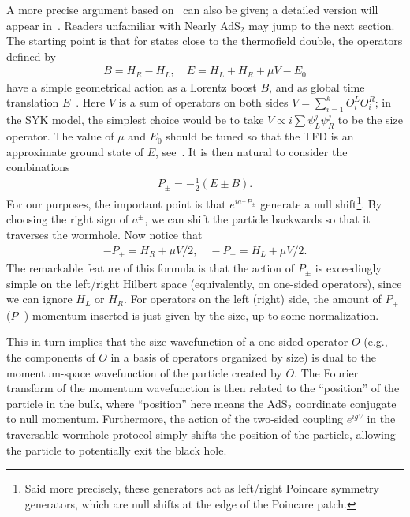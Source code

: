 \documentclass[aps,pra,reprint,floatfix,superscriptaddress, nofootinbib,longbibliography,onecolumn,notitlepage,12pt, tightenlines]{revtex4-1}
\begin{document}
\def\tfd{{\mathrm{TFD}}}
\newcommand{\eqn}[1]{\begin{equation}\begin{split} #1 \end{split}\end{equation}}

A more precise argument based on~\cite{lin2019symmetries} can also be given; a detailed version will appear in~\cite{longpaper}.  Readers unfamiliar with Nearly AdS$_2$ may jump to the next section.
The starting point is that for states close to the thermofield double, the operators defined by
\eqn{B = H_R - H_L, \quad E=H_L + H_R + \mu V - E_0 \label{eq:approximate-sym}}
have a simple geometrical action as a Lorentz boost $B$, and as global time translation $E$~\cite{maldacena2018eternal}.
Here $V$ is a sum of operators on both sides $V = \sum_{i=1}^k O_i^L O_i^R$; in the SYK model, the simplest choice would be to take $V \propto i \sum \psi^j_L \psi^j_R$ to be the size operator. The value of $\mu$ and $E_0$ should be tuned so that the TFD is an approximate ground state of $E$, see~\cite{maldacena2018eternal}. %
It is then natural to consider the combinations
\def\hf{ \frac{1}{2} }
\eqn{P_\pm = -\hf (E\pm B). }
For our purposes, the important point is that $e^{ia^\pm P_\pm}$ generate a null shift\footnote{Said more precisely, these generators act as left/right Poincare symmetry generators, which are null shifts at the edge of the Poincare patch.}. By choosing the right sign of $a^\pm$, we can shift the particle backwards so that it traverses the wormhole. Now notice that \eqn{-P_+ = H_R +  \mu V/2, \quad -P_- = H_L + \mu V/2.}
The remarkable feature of this formula is that the action of $P_\pm$ is exceedingly simple on the left/right Hilbert space (equivalently, on one-sided operators), since we can ignore $H_L$ or $H_R$. For operators on the left (right) side, the amount of $P_+$ ($P_-$) momentum inserted is just given by the size, up to some normalization.


This in turn implies that the size wavefunction of a one-sided operator $O$ (e.g., the components of $O$ in a basis of operators organized by size) is dual to the momentum-space wavefunction of the particle created by $O$. The Fourier transform of the momentum wavefunction is then related to the ``position'' of the particle in the bulk, where ``position'' here means the AdS$_2$ coordinate conjugate to null momentum. Furthermore, the action of the two-sided coupling $e^{igV}$ in the traversable wormhole protocol simply shifts the position of the particle, allowing the particle to potentially exit the black hole.
\end{document}
